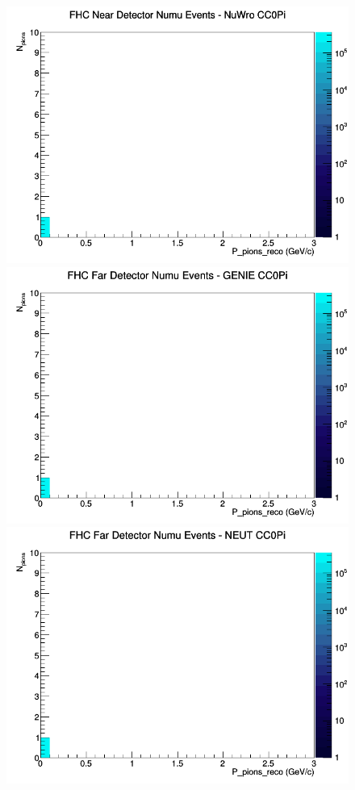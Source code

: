 \documentclass[12pt]{article}
\begin{document}
\begin{figure}[h]
\includegraphics[width=\linewidth]{eff_N_P/FGT/pions/CC0Pi_FHC_ND_numu_N_P_NuWro.png}
\endminipage
\newline
{}
\includegraphics[width=\linewidth]{eff_N_P/FGT/pions/CC0Pi_FHC_FD_numu_N_P_GENIE.png}
\endminipage
{}
\includegraphics[width=\linewidth]{eff_N_P/FGT/pions/CC0Pi_FHC_FD_numu_N_P_NEUT.png}

\end{figure}
\end{document}
